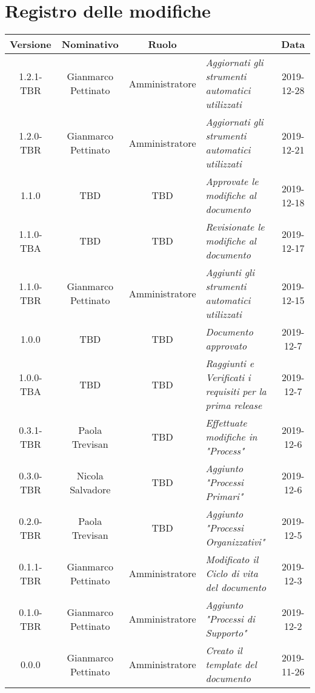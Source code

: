 \section*{Registro delle modifiche}
\renewcommand{\arraystretch}{1.8}

  \begin{longtable}{|c|c|c|p{3.8cm}|c|}
    \hline

    \rowcolor{header}
    \textbf{Versione} & \textbf{Nominativo} & \textbf{Ruolo} & \centering{\textbf{Descrizione}} & \textbf{Data}\\

    \hline
    1.2.1-TBR & Gianmarco Pettinato & Amministratore & \small{\textit{Aggiornati gli strumenti automatici utilizzati}}& 2019-12-28\\
    1.2.0-TBR & Gianmarco Pettinato & Amministratore & \small{\textit{Aggiornati gli strumenti automatici utilizzati}}& 2019-12-21\\
    1.1.0 & TBD & TBD & \small{\textit{Approvate le modifiche al documento}}& 2019-12-18\\
    1.1.0-TBA & TBD & TBD & \small{\textit{Revisionate le modifiche al documento}} & 2019-12-17\\
    1.1.0-TBR & Gianmarco Pettinato & Amministratore & \small{\textit{Aggiunti gli strumenti automatici utilizzati}} & 2019-12-15\\
    1.0.0 & TBD & TBD & \small{\textit{Documento approvato}} & 2019-12-7\\
    1.0.0-TBA & TBD & TBD &\small{\textit{Raggiunti e Verificati i requisiti per la prima release}} & 2019-12-7\\
    0.3.1-TBR & Paola Trevisan & TBD & \small{\textit{Effettuate modifiche in "Process"}} & 2019-12-6\\
    0.3.0-TBR & Nicola Salvadore & TBD & \small{\textit{Aggiunto "Processi Primari" }} & 2019-12-6\\
    0.2.0-TBR & Paola Trevisan & TBD & \small{\textit{Aggiunto "Processi Organizzativi"}} & 2019-12-5\\
    0.1.1-TBR & Gianmarco Pettinato & Amministratore & \small{\textit{Modificato il Ciclo di vita del documento}} & 2019-12-3\\
    0.1.0-TBR & Gianmarco Pettinato & Amministratore & \small{\textit{Aggiunto "Processi di Supporto"}} & 2019-12-2\\
    0.0.0 & Gianmarco Pettinato & Amministratore & \small{\textit{Creato il template del documento}} & 2019-11-26\\
    \hline
  \end{longtable}
